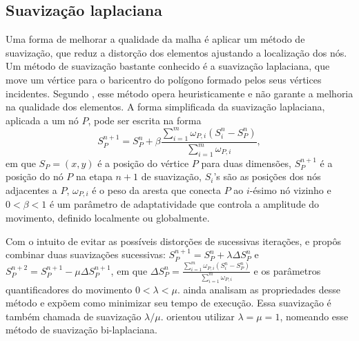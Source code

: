 \subsection{Suavização laplaciana}
\label{cap_suavizacao_laplaciana}

Uma forma de melhorar a qualidade da malha é aplicar um método de suavização, que reduz a distorção dos elementos ajustando a localização dos nós. Um método de suavização bastante conhecido é a suavização laplaciana, que move um vértice para o baricentro do polígono formado pelos seus vértices incidentes. Segundo , esse método opera heuristicamente e não garante a melhoria na qualidade dos elementos. A forma simplificada da suavização laplaciana, aplicada a um nó $P$, pode ser escrita na forma 
\[
S_{P}^{n+1} = S_{P}^{n} + \beta \frac{ \sum_{i=1}^{m} \omega_{P,i}(S_{i}^{n} - S_{P}^{n}) } { \sum_{i=1}^{m} \omega_{P,i} }, 
\]
\noindent em que $S_{P} = (x,y)$ é a posição do vértice $P$ para duas dimensões, $S_{P}^{n+1}$ é a posição do nó $P$ na etapa $n+1$ de suavização, $S_{i}$'s são as posições dos nós adjacentes a $P$, $\omega_{P,i}$ é o peso da aresta que conecta $P$ ao $i$-ésimo nó vizinho e $ 0 < \beta < 1$ é um parâmetro de adaptatividade que controla a amplitude do movimento, definido localmente ou globalmente. 

Com o intuito de evitar as possíveis distorções de sucessivas iterações,  e  propôs combinar duas suavizações sucessivas: $S_{P}^{n+1} = S_{P}^{n} + \lambda \Delta S_{P}^{n}$ e $S_{P}^{n+2} = S_{P}^{n+1} - \mu \Delta S_{P}^{n+1}$, em que $\Delta S_{P}^{n} =  \frac{ \sum_{i=1}^{m} \omega_{P,i}(S_{i}^{n} - S_{P}^{n}) } { \sum_{i=1}^{m} \omega_{P,i} }$ e os parâmetros quantificadores do movimento $0 < \lambda < \mu$.  ainda analisam as propriedades desse método e expõem como minimizar seu tempo de execução. Essa suavização é também chamada de suavização $\lambda/\mu$.  orientou utilizar $\lambda = \mu = 1$, nomeando esse método de suavização bi-laplaciana.